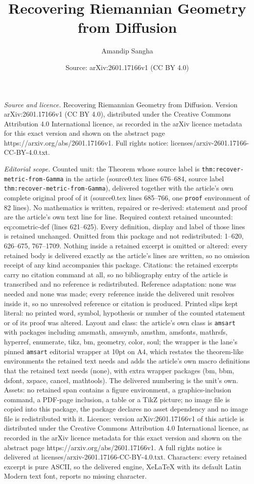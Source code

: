 \documentclass[10pt,a4paper]{amsart}
\title[Recovering Riemannian Geometry from Diffusion]{Recovering Riemannian Geometry from Diffusion}
\author{Amandip Sangha}
\date{Source: arXiv:2601.17166v1 (CC BY 4.0)}
\begin{document}
\maketitle

\noindent\emph{Source and licence.} Recovering Riemannian Geometry from Diffusion. Version arXiv:2601.17166v1 (CC BY 4.0), distributed under the Creative Commons Attribution 4.0 International licence, as recorded in the arXiv licence metadata for this exact version and shown on the abstract page https://arxiv.org/abs/2601.17166v1. Full rights notice: licenses/arxiv-2601.17166-CC-BY-4.0.txt.\par\smallskip

\noindent\textit{Editorial scope.} Counted unit: the Theorem whose source label is \texttt{thm:recover-metric-from-Gamma} in the article (source0.tex lines 676--684, source label \texttt{thm:recover-metric-from-Gamma}), delivered together with the article's own complete original proof of it (source0.tex lines 685--766, one \texttt{proof} environment of 82 lines). No mathematics is written, repaired or re-derived: statement and proof are the article's own text line for line. Required context retained uncounted: eq:cometric-def (lines 621--625). Every definition, display and label of those lines is retained unchanged. Omitted from this package and not redistributed: 1--620, 626--675, 767--1709. Nothing inside a retained excerpt is omitted or altered: every retained body is delivered exactly as the article's lines are written, so no omission receipt of any kind accompanies this package. Citations: the retained excerpts carry no citation command at all, so no bibliography entry of the article is transcribed and no reference is redistributed. Reference adaptation: none was needed and none was made; every reference inside the delivered unit resolves inside it, so no unresolved reference or citation is produced. Printed slips kept literal: no printed word, symbol, hypothesis or number of the counted statement or of its proof was altered. Layout and class: the article's own class is \texttt{amsart} with packages including amsmath, amssymb, amsthm, amsfonts, mathrsfs, hyperref, enumerate, tikz, bm, geometry, color, soul; the wrapper is the lane's pinned \texttt{amsart} editorial wrapper at 10pt on A4, which restates the theorem-like environments the retained text needs and adds the article's own macro definitions that the retained text needs (none), with extra wrapper packages (bm, bbm, dsfont, xspace, cancel, mathtools). The delivered numbering is the unit's own. Assets: no retained span contains a figure environment, a graphics-inclusion command, a PDF-page inclusion, a table or a TikZ picture; no image file is copied into this package, the package declares no asset dependency and no image file is redistributed with it. Licence: version arXiv:2601.17166v1 of this article is distributed under the Creative Commons Attribution 4.0 International licence, as recorded in the arXiv licence metadata for this exact version and shown on the abstract page https://arxiv.org/abs/2601.17166v1. A full rights notice is delivered at licenses/arxiv-2601.17166-CC-BY-4.0.txt. Characters: every retained excerpt is pure ASCII, so the delivered engine, XeLaTeX with its default Latin Modern text font, reports no missing character.
\end{document}
